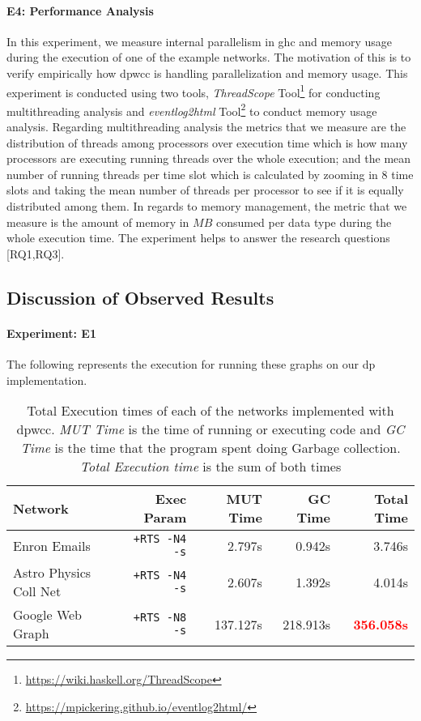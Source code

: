 \paragraph{E4: Performance Analysis}
In this experiment, we measure internal parallelism in \acrshort{ghc} and memory usage during the execution of one of the example networks. 
The motivation of this is to verify empirically how \acrshort{dpwcc} is handling parallelization and memory usage. 
This experiment is conducted using two tools, \textit{ThreadScope} Tool\footnote{\url{https://wiki.haskell.org/ThreadScope}} for conducting multithreading analysis and \textit{eventlog2html} Tool\footnote{\url{https://mpickering.github.io/eventlog2html/}} to conduct memory usage analysis. 
Regarding multithreading analysis the metrics that we measure are the distribution of threads among processors over execution time which is how many processors are executing running threads over the whole execution; and the mean number of running threads per time slot which is calculated by zooming in $8$ time slots and taking the mean number of threads per processor to see if it is equally distributed among them. 
In regards to memory management, the metric that we measure is the amount of memory in $MB$ consumed per data type during the whole execution time. 
The experiment helps to answer the research questions [RQ1,RQ3].

\subsection{Discussion of Observed Results}\label{new:experiments}
\paragraph{Experiment: E1}\label{sub:new:sec:e1}
The following represents the execution for running these graphs on our \acrshort{dp} implementation.

\begin{table}[H]
  \centering
  \begin{tabular}{|l|r|r|r|r|}
   \hline
   \textbf{Network} & \textbf{Exec Param} & \textbf{MUT Time} & \textbf{GC Time} & \textbf{Total Time}\\
   \hline
   Enron Emails & \texttt{+RTS -N4 -s} & 2.797s & 0.942s & 3.746s \\
   \hline
   Astro Physics Coll Net & \texttt{+RTS -N4 -s} & 2.607s & 1.392s & 4.014s \\
   \hline
   Google Web Graph & \texttt{+RTS -N8 -s} & 137.127s & 218.913s & \textbf{\textcolor{red}{356.058s}} \\
   \hline
  \end{tabular}
  \caption{Total Execution times of each of the networks implemented with \acrshort{dpwcc}. \textit{MUT Time} is the time of running or executing code and \textit{GC Time} is the time that the program spent doing Garbage collection. \textit{Total Execution time} is the sum of both times}
 \label{table:5}
 \end{table}

